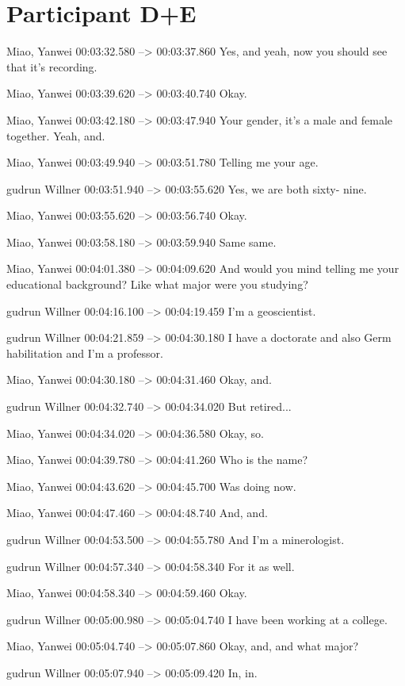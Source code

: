 \section*{Participant D+E}

{\parindent0pt
\tiny
\singlespacing
Miao, Yanwei 00:03:32.580 --> 00:03:37.860
Yes, and yeah, now you should see that it's recording.

Miao, Yanwei 00:03:39.620 --> 00:03:40.740
Okay.

Miao, Yanwei 00:03:42.180 --> 00:03:47.940
Your gender, it's a male and female together. Yeah, and.

Miao, Yanwei 00:03:49.940 --> 00:03:51.780
Telling me your age.

gudrun Willner 00:03:51.940 --> 00:03:55.620
Yes, we are both sixty- nine.

Miao, Yanwei 00:03:55.620 --> 00:03:56.740
Okay.

Miao, Yanwei 00:03:58.180 --> 00:03:59.940
Same same.

Miao, Yanwei 00:04:01.380 --> 00:04:09.620
And would you mind telling me your educational background? Like what major were you studying?

gudrun Willner 00:04:16.100 --> 00:04:19.459
I'm a geoscientist.

gudrun Willner 00:04:21.859 --> 00:04:30.180
I have a doctorate and also Germ habilitation and I'm a professor.

Miao, Yanwei 00:04:30.180 --> 00:04:31.460
Okay, and.

gudrun Willner 00:04:32.740 --> 00:04:34.020
But retired...

Miao, Yanwei 00:04:34.020 --> 00:04:36.580
Okay, so.

Miao, Yanwei 00:04:39.780 --> 00:04:41.260
Who is the name?

Miao, Yanwei 00:04:43.620 --> 00:04:45.700
Was doing now.

Miao, Yanwei 00:04:47.460 --> 00:04:48.740
And, and.

gudrun Willner 00:04:53.500 --> 00:04:55.780
And I'm a minerologist.

gudrun Willner 00:04:57.340 --> 00:04:58.340
For it as well.

Miao, Yanwei 00:04:58.340 --> 00:04:59.460
Okay.

gudrun Willner 00:05:00.980 --> 00:05:04.740
I have been working at a college.

Miao, Yanwei 00:05:04.740 --> 00:05:07.860
Okay, and, and what major?

gudrun Willner 00:05:07.940 --> 00:05:09.420
In, in.

}
